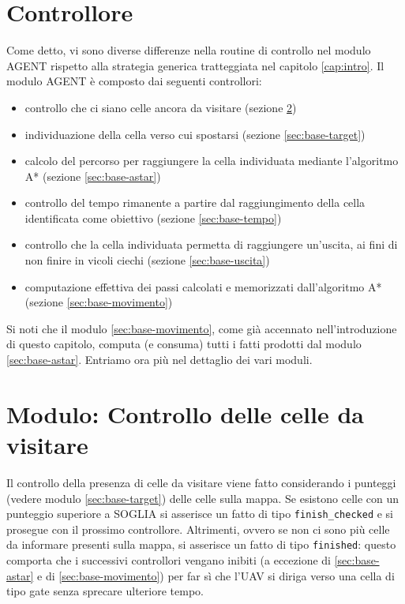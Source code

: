 \section{Controllore} \label{sec:base-controllore}
Come detto, vi sono diverse differenze nella routine di controllo nel modulo AGENT rispetto alla strategia generica tratteggiata nel capitolo \ref{cap:intro}. Il modulo AGENT è composto dai seguenti controllori:
\begin{itemize}
	\item controllo che ci siano celle ancora da visitare (sezione \ref{sec:base-finish})
	\item individuazione della cella verso cui spostarsi (sezione \ref{sec:base-target})
	\item calcolo del percorso per raggiungere la cella individuata mediante l'algoritmo A* (sezione \ref{sec:base-astar})
	\item controllo del tempo rimanente a partire dal raggiungimento della cella identificata come obiettivo (sezione \ref{sec:base-tempo})
	\item controllo che la cella individuata permetta di raggiungere un'uscita, ai fini di non finire in vicoli ciechi (sezione \ref{sec:base-uscita})
	\item computazione effettiva dei passi calcolati e memorizzati dall'algoritmo A* (sezione \ref{sec:base-movimento})
\end{itemize}
Si noti che il modulo \ref{sec:base-movimento}, come già accennato nell'introduzione di questo capitolo, computa (e consuma) tutti i fatti prodotti dal modulo \ref{sec:base-astar}. Entriamo ora più nel dettaglio dei vari moduli.

\section{Modulo: Controllo delle celle da visitare} \label{sec:base-finish}
Il controllo della presenza di celle da visitare viene fatto considerando i punteggi (vedere modulo \ref{sec:base-target}) delle celle sulla mappa. Se esistono celle con un punteggio superiore a {\color{red} SOGLIA} si asserisce un fatto di tipo \texttt{finish\_checked} e si prosegue con il prossimo controllore. Altrimenti, ovvero se non ci sono più celle da informare presenti sulla mappa, si asserisce un fatto di tipo \texttt{finished}: questo comporta che i successivi controllori vengano inibiti ({\color{red}a eccezione di \ref{sec:base-astar} e di \ref{sec:base-movimento}}) per far sì che l'UAV si diriga verso una cella di tipo gate senza sprecare ulteriore tempo.

